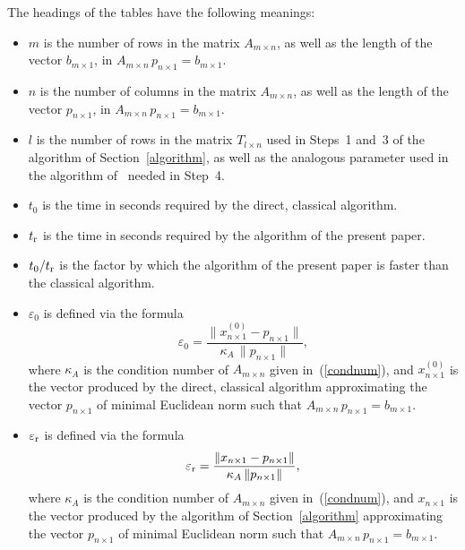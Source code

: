 \documentclass[letterpaper,12pt]{article}
\def\epsilon{\varepsilon}
\begin{document}
The headings of the tables have the following meanings:
\begin{itemize}
\item $m$ is the number of rows in the matrix $A_{m \times n}$,
      as well as the length of the vector $b_{m \times 1}$,
      in $A_{m \times n} \, p_{n \times 1} = b_{m \times 1}$.
\item $n$ is the number of columns in the matrix $A_{m \times n}$,
      as well as the length of the vector $p_{n \times 1}$,
      in $A_{m \times n} \, p_{n \times 1} = b_{m \times 1}$.
\item $l$ is the number of rows in the matrix $T_{l \times n}$ used
      in Steps~1 and~3 of the algorithm of Section~\ref{algorithm},
      as well as the analogous parameter used in the algorithm
      of~\cite{rokhlin-tygert} needed in Step~4.
\item $t_0$ is the time in seconds required
      by the direct, classical algorithm.
\item $t_{\rm r}$ is the time in seconds required
      by the algorithm of the present paper.
\item $t_0/t_{\rm r}$ is the factor by which
      the algorithm of the present paper
      is faster than the classical algorithm.
\item $\epsilon_0$ is defined via the formula
\begin{equation}
\epsilon_0 = \frac{\| x_{n \times 1}^{(0)} - p_{n \times 1} \|}
                  {\kappa_A \, \| p_{n \times 1} \|},
\end{equation}
where $\kappa_A$ is the condition number of $A_{m \times n}$ given
in~(\ref{condnum}), and $x_{n \times 1}^{(0)}$ is the vector
produced by the direct, classical algorithm
approximating the vector $p_{n \times 1}$ of minimal Euclidean norm
such that $A_{m \times n} \, p_{n \times 1} = b_{m \times 1}$.
\item $\epsilon_{\rm r}$ is defined via the formula
\begin{equation}
\epsilon_{\rm r} = \frac{\| x_{n \times 1} - p_{n \times 1} \|}
                        {\kappa_A \, \| p_{n \times 1} \|},
\end{equation}
where $\kappa_A$ is the condition number of $A_{m \times n}$ given
in~(\ref{condnum}), and $x_{n \times 1}$ is the vector
produced by the algorithm of Section~\ref{algorithm}
approximating the vector $p_{n \times 1}$ of minimal Euclidean norm
such that $A_{m \times n} \, p_{n \times 1} = b_{m \times 1}$.
\end{itemize}
\end{document}
